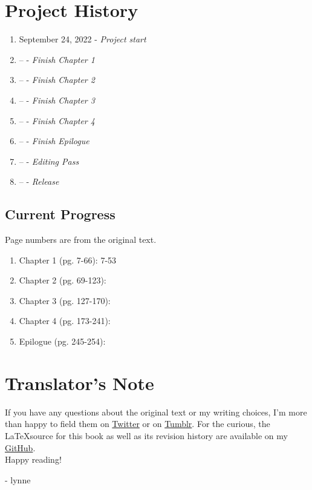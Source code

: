 \section*{Project History}
\begin{enumerate}
	\item September 24, 2022 - \emph{Project start}
	\item -- - \emph{Finish Chapter 1}
	\item -- - \emph{Finish Chapter 2}
	\item -- - \emph{Finish Chapter 3}
	\item -- - \emph{Finish Chapter 4}
	\item -- - \emph{Finish Epilogue}
	\item -- - \emph{Editing Pass}
	\item -- - \emph{Release}
\end{enumerate}
\subsection*{Current Progress}
Page numbers are from the original text.
\begin{enumerate}
	\item Chapter 1 (pg. 7-66): 7-53
	\item Chapter 2 (pg. 69-123):
	\item Chapter 3 (pg. 127-170):
	\item Chapter 4 (pg. 173-241):
	\item Epilogue (pg. 245-254):
\end{enumerate}

\section*{Translator's Note}
If you have any questions about the original text or my writing choices, I'm more than happy to field them on \href{https://twitter.com/plvpwaa}{Twitter} or on \href{https://plvpwaa.tumblr.com}{Tumblr}.
For the curious, the \LaTeX \space source for this book as well as its revision history are available on my \href{https://github.com/Spirati/translation-octopath}{GitHub}. 
\\

Happy reading!

- lynne